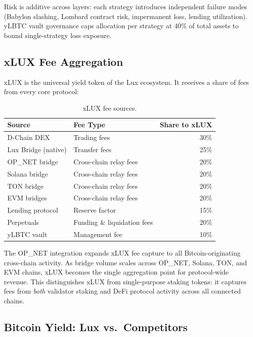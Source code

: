 Risk is additive across layers: each strategy introduces independent failure modes (Babylon slashing, Lombard contract risk, impermanent loss, lending utilization). yLBTC vault governance caps allocation per strategy at 40\% of total assets to bound single-strategy loss exposure.

\subsection{xLUX Fee Aggregation}\label{sec:xlux-fees}

xLUX is the universal yield token of the Lux ecosystem. It receives a share of fees from every core protocol:

\begin{table}[H]
\centering
\caption{xLUX fee sources.}
\label{tab:xlux_sources}
\begin{tabular}{llr}
\toprule
\textbf{Source} & \textbf{Fee Type} & \textbf{Share to xLUX} \\
\midrule
D-Chain DEX & Trading fees & 30\% \\
Lux Bridge (native) & Transfer fees & 25\% \\
OP\_NET bridge & Cross-chain relay fees & 20\% \\
Solana bridge & Cross-chain relay fees & 20\% \\
TON bridge & Cross-chain relay fees & 20\% \\
EVM bridges & Cross-chain relay fees & 20\% \\
Lending protocol & Reserve factor & 15\% \\
Perpetuals & Funding \& liquidation fees & 20\% \\
yLBTC vault & Management fee & 10\% \\
\bottomrule
\end{tabular}
\end{table}

The OP\_NET integration expands xLUX fee capture to all Bitcoin-originating cross-chain activity. As bridge volume scales across OP\_NET, Solana, TON, and EVM chains, xLUX becomes the single aggregation point for protocol-wide revenue. This distinguishes xLUX from single-purpose staking tokens: it captures fees from \emph{both} validator staking and DeFi protocol activity across all connected chains.

\subsection{Bitcoin Yield: Lux vs.\ Competitors}\label{sec:btc-comparison}

